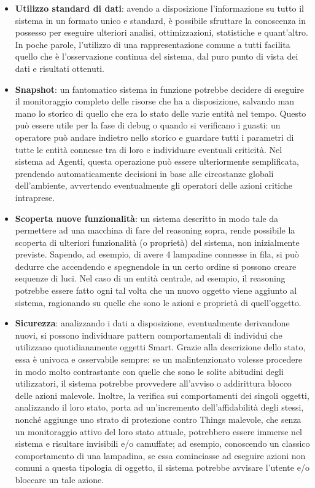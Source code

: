 \documentclass[12pt,a4paper,openright,oneside]{report}
\begin{document}
\begin{itemize}
	\item \textbf{Utilizzo standard di dati}: avendo a disposizione l'informazione su tutto il sistema in un formato unico e standard, è possibile sfruttare la conoscenza in possesso per eseguire ulteriori analisi, ottimizzazioni, statistiche e quant'altro. In poche parole, l'utilizzo di una rappresentazione comune a tutti facilita quello che è l'osservazione continua del sistema, dal puro punto di vista dei dati e risultati ottenuti.
	
	\item \textbf{Snapshot}: un fantomatico sistema in funzione potrebbe decidere di eseguire il monitoraggio completo delle risorse che ha a disposizione, salvando man mano lo storico di quello che era lo stato delle varie entità nel tempo. Questo può essere utile per la fase di debug o quando si verificano i guasti: un operatore può andare indietro nello storico e guardare tutti i parametri di tutte le entità connesse tra di loro e individuare eventuali criticità. Nel sistema ad Agenti, questa operazione può essere ulteriormente semplificata, prendendo automaticamente decisioni in base alle circostanze globali dell'ambiente, avvertendo eventualmente gli operatori delle azioni critiche intraprese.
	
	\item \textbf{Scoperta nuove funzionalità}: un sistema descritto in modo tale da permettere ad una macchina di fare del reasoning sopra, rende possibile la scoperta di ulteriori funzionalità (o proprietà) del sistema, non inizialmente previste. Sapendo, ad esempio, di avere 4 lampadine connesse in fila, si può dedurre che accendendo e spegnendole in un certo ordine si possono creare sequenze di luci. Nel caso di un entità centrale, ad esempio, il reasoning potrebbe essere fatto ogni tal volta che un nuovo oggetto viene aggiunto al sistema, ragionando su quelle che sono le azioni e proprietà di quell'oggetto.
	
	\item \textbf{Sicurezza}: analizzando i dati a disposizione, eventualmente derivandone nuovi, si possono individuare pattern comportamentali di individui che utilizzano quotidianamente oggetti Smart. Grazie alla descrizione dello stato, essa è univoca e osservabile sempre: se un malintenzionato volesse procedere in modo molto contrastante con quelle che sono le solite abitudini degli utilizzatori, il sistema potrebbe provvedere all'avviso o addirittura blocco delle azioni malevole. Inoltre, la verifica sui comportamenti dei singoli oggetti, analizzando il loro stato, porta ad un'incremento dell'affidabilità degli stessi, nonché aggiunge uno strato di protezione contro Things malevole, che senza un monitoraggio attivo del loro stato attuale, potrebbero essere immerse nel sistema e risultare invisibili e/o camuffate; ad esempio, conoscendo un classico comportamento di una lampadina, se essa cominciasse ad eseguire azioni non comuni a questa tipologia di oggetto, il sistema potrebbe avvisare l'utente e/o bloccare un tale azione.
	

\end{itemize}
\end{document}
